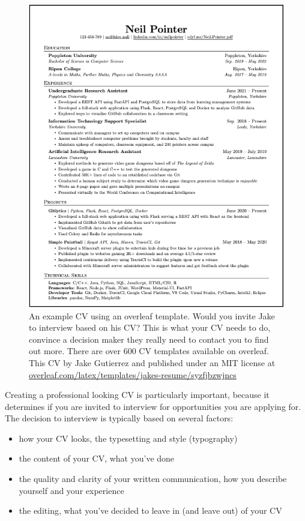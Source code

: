 \documentclass[
]{book}
\providecommand{\tightlist}{%
  \setlength{\itemsep}{0pt}\setlength{\parskip}{0pt}}
\begin{document}
\begin{figure}

{\centering \includegraphics[width=1\linewidth]{images/jake-ryan} 

}

\caption{An example CV using an overleaf template. Would you invite Jake to interview based on his CV? This is what your CV needs to do, convince a decision maker they really need to contact you to find out more. There are over 600 CV templates available on overleaf. This CV by Jake Gutierrez and published under an MIT license at \href{https://www.overleaf.com/latex/templates/jakes-resume/syzfjbzwjncs}{overleaf.com/latex/templates/jakes-resume/syzfjbzwjncs}}\label{fig:cv-fig}
\end{figure}



Creating a professional looking CV is particularly important, because it determines if you are invited to interview for opportunities you are applying for. The decision to interview is typically based on several factors:

\begin{itemize}
\tightlist
\item
  how your CV looks, the typesetting and style (typography)
\item
  the content of your CV, what you've done
\item
  the quality and clarity of your written communication, how you describe yourself and your experience
\item
  the editing, what you've decided to leave in (and leave out) of your CV
\end{itemize}
\end{document}
